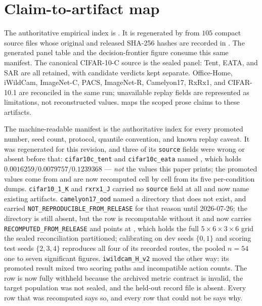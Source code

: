 \section{Claim-to-artifact map}\label{app:claim-artifact}
The authoritative empirical index is
. It is regenerated
by  from $105$ compact source files whose original and
released SHA-256 hashes are recorded in . The generated panel table and
the decision-frontier figure consume this same manifest. The canonical CIFAR-10-C source is the
sealed  panel: Tent, EATA, and SAR are all retained, with candidate
verdicts kept separate. Office-Home, iWildCam, ImageNet-C, PACS, ImageNet-R, Camelyon17, RxRx1, and
CIFAR-10.1 are reconciled in the same run; unavailable replay fields are represented as limitations,
not reconstructed values.  maps the scoped prose claims to these artifacts.

\iffalse
The machine-readable manifest  is the
authoritative index for every promoted number, seed count, protocol, quantile convention, and known
replay caveat. It was regenerated for this revision, and three of its \texttt{source} fields were
wrong or absent before that: \texttt{cifar10c\_tent} and \texttt{cifar10c\_eata} named
, which holds
$0.0016259/0.0079757/0.1239368$ --- \emph{not} the values this paper prints; the promoted values
come from  and are now recomputed cell by cell from its five
per-condition dumps. \texttt{cifar10\_1\_K} and \texttt{rxrx1\_J} carried no \texttt{source} field
at all and now name existing artifacts. \texttt{camelyon17\_ood} named a directory that does not
exist, and carried \texttt{NOT\_REPRODUCIBLE\_FROM\_RELEASE} for that reason until 2026-07-26; the
directory is still absent, but the row is recomputable without it and now carries
\texttt{RECOMPUTED\_FROM\_RELEASE} and points at
, which holds the full
$5\times6\times3\times6$ grid the sealed reconciliation partitioned; calibrating on dev seeds
$\{0,1\}$ and scoring test seeds $\{2,3,4\}$ reproduces all four of its recorded routes, the pooled
$n{=}54$ one to seven significant figures. \texttt{iwildcam\_H\_v2} moved the other way: its
promoted result mixed two scoring paths and incompatible action counts. The row is now fully
withheld because the archived metric contract is invalid, the target population was not sealed,
and the held-out record file is absent. Every row that was recomputed says so, and every row that
could not be says why.


